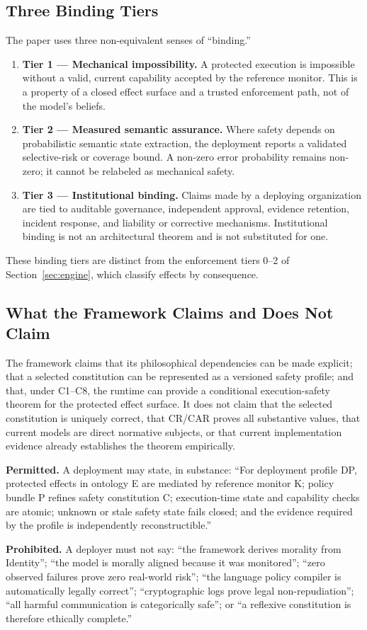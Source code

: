 \documentclass[11pt]{article}
\begin{document}
\subsection{Three Binding Tiers}
The paper uses three non-equivalent senses of ``binding.''
\begin{enumerate}[label=(\arabic*)]
\item \textbf{Tier 1 --- Mechanical impossibility.} A protected execution is impossible without a valid, current capability accepted by the reference monitor. This is a property of a closed effect surface and a trusted enforcement path, not of the model's beliefs.
\item \textbf{Tier 2 --- Measured semantic assurance.} Where safety depends on probabilistic semantic state extraction, the deployment reports a validated selective-risk or coverage bound. A non-zero error probability remains non-zero; it cannot be relabeled as mechanical safety.
\item \textbf{Tier 3 --- Institutional binding.} Claims made by a deploying organization are tied to auditable governance, independent approval, evidence retention, incident response, and liability or corrective mechanisms. Institutional binding is not an architectural theorem and is not substituted for one.
\end{enumerate}
These binding tiers are distinct from the enforcement tiers 0--2 of Section~\ref{sec:engine}, which classify effects by consequence.

\subsection{What the Framework Claims and Does Not Claim}
The framework claims that its philosophical dependencies can be made explicit; that a selected constitution can be represented as a versioned safety profile; and that, under C1--C8, the runtime can provide a conditional execution-safety theorem for the protected effect surface. It does not claim that the selected constitution is uniquely correct, that CR/CAR proves all substantive values, that current models are direct normative subjects, or that current implementation evidence already establishes the theorem empirically.

\begin{excludedclaims}
\textbf{Permitted.} A deployment may state, in substance: ``For deployment profile DP, protected effects in ontology E are mediated by reference monitor K; policy bundle P refines safety constitution C; execution-time state and capability checks are atomic; unknown or stale safety state fails closed; and the evidence required by the profile is independently reconstructible.''

\textbf{Prohibited.} A deployer must not say: ``the framework derives morality from Identity''; ``the model is morally aligned because it was monitored''; ``zero observed failures prove zero real-world risk''; ``the language policy compiler is automatically legally correct''; ``cryptographic logs prove legal non-repudiation''; ``all harmful communication is categorically safe''; or ``a reflexive constitution is therefore ethically complete.''
\end{excludedclaims}
\end{document}
